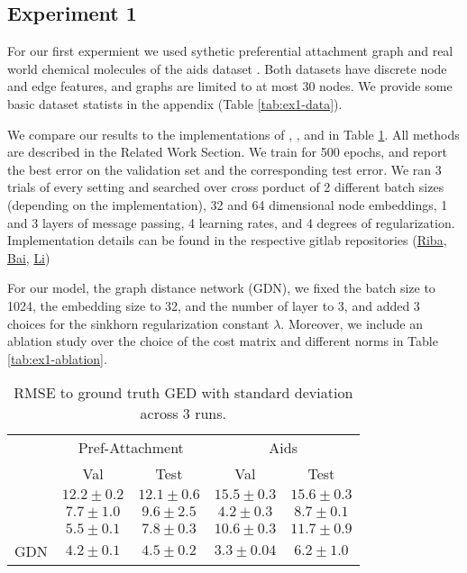 \subsection{Experiment 1}

For our first expermient we used sythetic preferential attachment graph \cite{pref_att2002} and real world chemical molecules of the aids dataset \cite{?}. Both datasets have discrete node and edge features, and graphs are limited to at most 30 nodes. We provide some basic dataset statists in the appendix (Table \ref{tab:ex1-data}).

We compare our results to the implementations of \cite{riba2018}, \cite{bai2019}, and \cite{li2019} in Table \ref{tab:ex1-baselines}. All methods are described in the Related Work Section. We train for 500 epochs, and report the best error on the validation set and the corresponding test error. We ran 3 trials of every setting and searched over cross porduct of 2 different batch sizes (depending on the implementation), 32 and 64 dimensional node embeddings, 1 and 3 layers of message passing, 4 learning rates, and 4 degrees of regularization. Implementation details can be found in the respective gitlab repositories (\href{https://gitlab.lrz.de/ge98beq/siamese_ged}{Riba}, \href{https://gitlab.lrz.de/ge98beq/simgnn}{Bai}, \href{https://gitlab.lrz.de/ge98beq/gmn/tree/gr_report}{Li})

For our model, the graph distance network (GDN), we fixed the batch size to 1024, the embedding size to 32, and the number of layer to 3, and added 3 choices for the sinkhorn regularization constant $\lambda$. Moreover, we include an ablation study over the choice of the cost matrix and different norms in Table \ref{tab:ex1-ablation}.

\begin{table}[htbp]
    \addtolength{\tabcolsep}{-1pt}
    \fontsize{9pt}{10.25pt}\selectfont
    \centering
    \renewcommand{\arraystretch}{1.2}
    \begin{tabular}{|l|c|c|c|c|}
        \hline
        \multirow{2}{*}{} & \multicolumn{2}{c|}{Pref-Attachment} & \multicolumn{2}{c|}{Aids} \\ \hhline{|~|-|-|-|-|}
        & Val & Test & Val & Test \\ \hhline{|=|=|=|=|=|}
        \cite{riba2018} & $12.2 \pm 0.2$ & $12.1 \pm 0.6$ & $15.5 \pm 0.3$  & $15.6 \pm 0.3$ \\ \hline
        \cite{bai2019} & $7.7 \pm 1.0$ & $9.6 \pm 2.5$ & $4.2 \pm 0.3$ & $8.7 \pm 0.1$ \\ \hline
        \cite{li2019} & $5.5 \pm 0.1 $ & $7.8 \pm 0.3$ & $10.6 \pm 0.3$ & $11.7 \pm 0.9$ \\ \hline
        GDN & $4.2 \pm 0.1$ & $\boldsymbol{4.5 \pm 0.2}$ & $3.3 \pm 0.04$ & $\boldsymbol{6.2 \pm 1.0}$ \\ \hline
    \end{tabular}
    \caption{RMSE to ground truth GED with standard deviation across 3 runs.}
    \label{tab:ex1-baselines}
\end{table}


